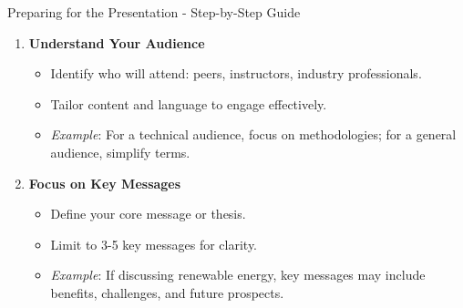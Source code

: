 \documentclass[aspectratio=169]{beamer}
\begin{document}
\begin{frame}[fragile]{Preparing for the Presentation - Step-by-Step Guide}
    \begin{enumerate}
        \item \textbf{Understand Your Audience}
        \begin{itemize}
            \item Identify who will attend: peers, instructors, industry professionals.
            \item Tailor content and language to engage effectively.
            \item \textit{Example}: For a technical audience, focus on methodologies; for a general audience, simplify terms.
        \end{itemize}

        \item \textbf{Focus on Key Messages}
        \begin{itemize}
            \item Define your core message or thesis.
            \item Limit to 3-5 key messages for clarity.
            \item \textit{Example}: If discussing renewable energy, key messages may include benefits, challenges, and future prospects.
        \end{itemize}
    \end{enumerate}
\end{frame}
\end{document}
